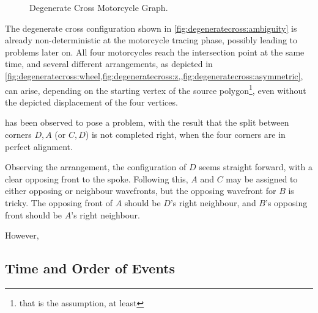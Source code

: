 \documentclass[12pt,a4paper,oneside,openany]{article}
\begin{document}
\begin{figure}[htpb]
\begin{center}
{		\label{fig:degeneratecross:z}}
\caption{Degenerate Cross Motorcycle Graph.}
\label{fig:degeneratecross}
\end{center}
\end{figure}


The degenerate cross configuration shown in \cref{fig:degeneratecross:ambiguity} is already non-deterministic at the motorcycle tracing phase, possibly leading to problems later on. All four motorcycles reach the intersection point at the same time, and several different arrangements, as depicted in \cref{fig:degeneratecross:wheel,fig:degeneratecross:z,,fig:degeneratecross:asymmetric}, can arise, depending on the starting vertex of the source polygon\footnote{that is the assumption, at least}, even without the depicted displacement of the four vertices.

 has been observed to pose a problem, with the result that the split between corners $D,A$ (or $C,D$) is not completed right, when the four corners are in perfect alignment.

Observing the arrangement, the configuration of $D$ seems straight forward, with a clear opposing front to the spoke. Following this, $A$ and $C$ may be assigned to either opposing or neighbour wavefronts, but the opposing wavefront for $B$ is tricky. The opposing front of $A$ should be $D$'s right neighbour, and $B$'s opposing front should be $A$'s right neighbour.

However, 

\subsection{Time and Order of Events}
\end{document}
